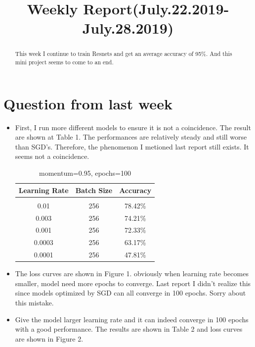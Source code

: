 \documentclass{article} %
\title{Weekly Report(July.22.2019-July.28.2019)}
\begin{document}
\maketitle

\begin{abstract}
This week I continue to train Resnets and get an average accuracy of 95\%. And this mini project seems to come to an end.

\end{abstract}

\section{Question from last week}

\begin{itemize}
\item First, I run more different models to ensure it is not a coincidence. The result are shown at Table 1. The performances are relatively steady and still worse than SGD's. Therefore, the phenomenon I metioned last report still exists. It seems not a coincidence. 

\begin{table}[h]
\caption{momentum=0.95, epochs=100}
\begin{center}
\begin{tabular}{c|c|c}
\multicolumn{1}{c}{\bf Learning Rate} & \multicolumn{1}{c}{\bf Batch Size} &\multicolumn{1}{c}{\bf Accuracy}
\\ \hline \\
0.01 & 256 & 78.42\% \\
0.003 & 256 & 74.21\% \\
0.001 & 256 & 72.33\% \\
0.0003 & 256 & 63.17\% \\
0.0001 & 256 & 47.81\%
\end{tabular}
\end{center}
\end{table}

\item The loss curves are shown in Figure 1. obviously when learning rate becomes smaller, model need more epochs to converge. Last report I didn't realize this since models optimized by SGD can all converge in 100 epochs. Sorry about this mistake.

\item Give the model larger learning rate and it can indeed converge in 100 epochs with a good performance. The results are shown in Table 2 and loss curves are shown in Figure 2.


\end{itemize}
\end{document}
